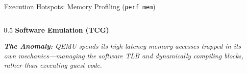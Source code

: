 \documentclass[aspectratio=169]{beamer} %
\begin{document}
\begin{frame}{Execution Hotspots: Memory Profiling (\texttt{perf mem})}
\begin{columns}[T]
          \begin{column}{0.5\textwidth}
              \textbf{Software Emulation (TCG)}
              \vspace{0.1cm}
              \begin{table}[]
                  \renewcommand{\arraystretch}{1.2}
              \end{table}
              \vspace{0.1cm}
              \footnotesize \textit{\textbf{The Anomaly:} QEMU spends its high-latency memory accesses trapped in its own mechanics—managing the software TLB and dynamically compiling blocks, rather than executing guest code.}
          \end{column}
      \end{columns}
  \end{frame}
\end{document}
